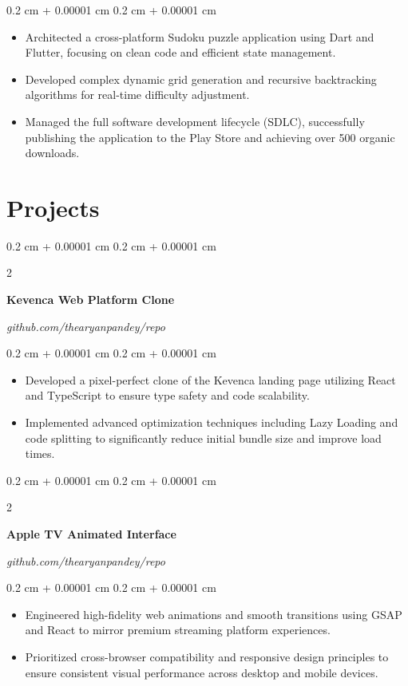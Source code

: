 \documentclass[10pt, a4paper]{article}
\newenvironment{highlights}{
    \begin{itemize}[
        topsep=0.10 cm,
        parsep=0.10 cm,
        partopsep=0pt,
        itemsep=0pt,
        leftmargin=0.4 cm + 10pt
    ]
}{
    \end{itemize}
} %
\newenvironment{onecolentry}{
    \begin{adjustwidth}{
        0.2 cm + 0.00001 cm
    }{
        0.2 cm + 0.00001 cm
    }
}{
    \end{adjustwidth}
} %
\newenvironment{twocolentry}[2][]{
    \onecolentry
    \def\secondColumn{#2}
    \setcolumnwidth{\fill, 4.5 cm}
    \begin{paracol}{2}
}{
    \switchcolumn \raggedleft \secondColumn
    \end{paracol}
    \endonecolentry
} %
\begin{document}
        \vspace{0.10 cm}
        \begin{onecolentry}
        \begin{highlights}
            \item Architected a cross-platform Sudoku puzzle application using Dart and Flutter, focusing on clean code and efficient state management.
\item Developed complex dynamic grid generation and recursive backtracking algorithms for real-time difficulty adjustment.
\item Managed the full software development lifecycle (SDLC), successfully publishing the application to the Play Store and achieving over 500 organic downloads.
        \end{highlights}
        \end{onecolentry}
        \vspace{0.2 cm}
        

    \section{Projects}
\begin{twocolentry}{
        \textit{github.com/thearyanpandey/repo}
    }
    \textbf{Kevenca Web Platform Clone}
    \end{twocolentry}

    \vspace{0.10 cm}
    \begin{onecolentry}
    \begin{highlights}
        \item Developed a pixel-perfect clone of the Kevenca landing page utilizing React and TypeScript to ensure type safety and code scalability.
\item Implemented advanced optimization techniques including Lazy Loading and code splitting to significantly reduce initial bundle size and improve load times.
    \end{highlights}
    \end{onecolentry}
    \vspace{0.2 cm}
\begin{twocolentry}{
        \textit{github.com/thearyanpandey/repo}
    }
    \textbf{Apple TV Animated Interface}
    \end{twocolentry}

    \vspace{0.10 cm}
    \begin{onecolentry}
    \begin{highlights}
        \item Engineered high-fidelity web animations and smooth transitions using GSAP and React to mirror premium streaming platform experiences.
\item Prioritized cross-browser compatibility and responsive design principles to ensure consistent visual performance across desktop and mobile devices.
    \end{highlights}
    \end{onecolentry}
    \vspace{0.2 cm}
\end{document}
